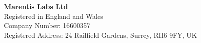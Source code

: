 \documentclass[11pt, a4paper]{article}
\begin{document}
\null %
\vfill %

\begin{flushleft}
    \scriptsize %
    \color{ml-slate-grey} %
    
    {\bfseries Marentis Labs Ltd} %
    \\[1.5ex]
    Registered in England and Wales
    \\[1ex]
    Company Number: 16600357
    \\[1ex]
    Registered Address: 24 Railfield Gardens, Surrey, RH6 9FY, UK
\end{flushleft}


\end{document}
